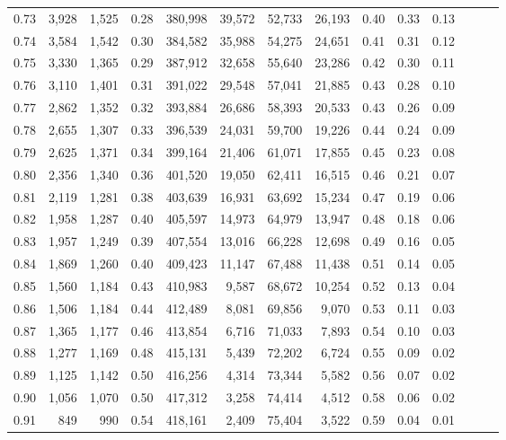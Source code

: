 \begin{tabular}{rrrrrrrrrrrrrr}
0.73 &  3,928 &  1,525 &  0.28 &  380,998 &   39,572 &  52,733 &  26,193 &  0.40 &  0.33 &      0.13 \\
0.74 &  3,584 &  1,542 &  0.30 &  384,582 &   35,988 &  54,275 &  24,651 &  0.41 &  0.31 &      0.12 \\
0.75 &  3,330 &  1,365 &  0.29 &  387,912 &   32,658 &  55,640 &  23,286 &  0.42 &  0.30 &      0.11 \\
0.76 &  3,110 &  1,401 &  0.31 &  391,022 &   29,548 &  57,041 &  21,885 &  0.43 &  0.28 &      0.10 \\
0.77 &  2,862 &  1,352 &  0.32 &  393,884 &   26,686 &  58,393 &  20,533 &  0.43 &  0.26 &      0.09 \\
0.78 &  2,655 &  1,307 &  0.33 &  396,539 &   24,031 &  59,700 &  19,226 &  0.44 &  0.24 &      0.09 \\
0.79 &  2,625 &  1,371 &  0.34 &  399,164 &   21,406 &  61,071 &  17,855 &  0.45 &  0.23 &      0.08 \\
0.80 &  2,356 &  1,340 &  0.36 &  401,520 &   19,050 &  62,411 &  16,515 &  0.46 &  0.21 &      0.07 \\
0.81 &  2,119 &  1,281 &  0.38 &  403,639 &   16,931 &  63,692 &  15,234 &  0.47 &  0.19 &      0.06 \\
0.82 &  1,958 &  1,287 &  0.40 &  405,597 &   14,973 &  64,979 &  13,947 &  0.48 &  0.18 &      0.06 \\
0.83 &  1,957 &  1,249 &  0.39 &  407,554 &   13,016 &  66,228 &  12,698 &  0.49 &  0.16 &      0.05 \\
0.84 &  1,869 &  1,260 &  0.40 &  409,423 &   11,147 &  67,488 &  11,438 &  0.51 &  0.14 &      0.05 \\
0.85 &  1,560 &  1,184 &  0.43 &  410,983 &    9,587 &  68,672 &  10,254 &  0.52 &  0.13 &      0.04 \\
0.86 &  1,506 &  1,184 &  0.44 &  412,489 &    8,081 &  69,856 &   9,070 &  0.53 &  0.11 &      0.03 \\
0.87 &  1,365 &  1,177 &  0.46 &  413,854 &    6,716 &  71,033 &   7,893 &  0.54 &  0.10 &      0.03 \\
0.88 &  1,277 &  1,169 &  0.48 &  415,131 &    5,439 &  72,202 &   6,724 &  0.55 &  0.09 &      0.02 \\
0.89 &  1,125 &  1,142 &  0.50 &  416,256 &    4,314 &  73,344 &   5,582 &  0.56 &  0.07 &      0.02 \\
0.90 &  1,056 &  1,070 &  0.50 &  417,312 &    3,258 &  74,414 &   4,512 &  0.58 &  0.06 &      0.02 \\
0.91 &    849 &    990 &  0.54 &  418,161 &    2,409 &  75,404 &   3,522 &  0.59 &  0.04 &      0.01 \\

\end{tabular}
